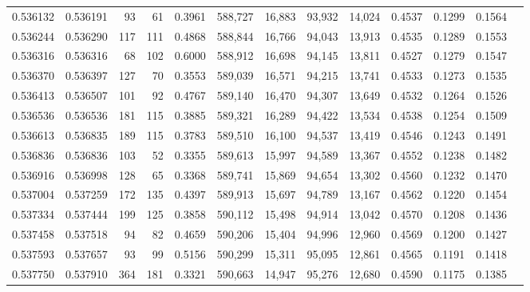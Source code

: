 \begin{tabular}{rrrrrrrrrrrrr}
0.536132 & 0.536191 &    93 &    61 &                                     0.3961 & 588,727 &  16,883 &  93,932 &  14,024 & 0.4537 & 0.1299 & 0.1564 \\
0.536244 & 0.536290 &   117 &   111 &                                     0.4868 & 588,844 &  16,766 &  94,043 &  13,913 & 0.4535 & 0.1289 & 0.1553 \\
0.536316 & 0.536316 &    68 &   102 &                                     0.6000 & 588,912 &  16,698 &  94,145 &  13,811 & 0.4527 & 0.1279 & 0.1547 \\
0.536370 & 0.536397 &   127 &    70 &                                     0.3553 & 589,039 &  16,571 &  94,215 &  13,741 & 0.4533 & 0.1273 & 0.1535 \\
0.536413 & 0.536507 &   101 &    92 &                                     0.4767 & 589,140 &  16,470 &  94,307 &  13,649 & 0.4532 & 0.1264 & 0.1526 \\
0.536536 & 0.536536 &   181 &   115 &                                     0.3885 & 589,321 &  16,289 &  94,422 &  13,534 & 0.4538 & 0.1254 & 0.1509 \\
0.536613 & 0.536835 &   189 &   115 &                                     0.3783 & 589,510 &  16,100 &  94,537 &  13,419 & 0.4546 & 0.1243 & 0.1491 \\
0.536836 & 0.536836 &   103 &    52 &                                     0.3355 & 589,613 &  15,997 &  94,589 &  13,367 & 0.4552 & 0.1238 & 0.1482 \\
0.536916 & 0.536998 &   128 &    65 &                                     0.3368 & 589,741 &  15,869 &  94,654 &  13,302 & 0.4560 & 0.1232 & 0.1470 \\
0.537004 & 0.537259 &   172 &   135 &                                     0.4397 & 589,913 &  15,697 &  94,789 &  13,167 & 0.4562 & 0.1220 & 0.1454 \\
0.537334 & 0.537444 &   199 &   125 &                                     0.3858 & 590,112 &  15,498 &  94,914 &  13,042 & 0.4570 & 0.1208 & 0.1436 \\
0.537458 & 0.537518 &    94 &    82 &                                     0.4659 & 590,206 &  15,404 &  94,996 &  12,960 & 0.4569 & 0.1200 & 0.1427 \\
0.537593 & 0.537657 &    93 &    99 &                                     0.5156 & 590,299 &  15,311 &  95,095 &  12,861 & 0.4565 & 0.1191 & 0.1418 \\
0.537750 & 0.537910 &   364 &   181 &                                     0.3321 & 590,663 &  14,947 &  95,276 &  12,680 & 0.4590 & 0.1175 & 0.1385 \\

\end{tabular}
